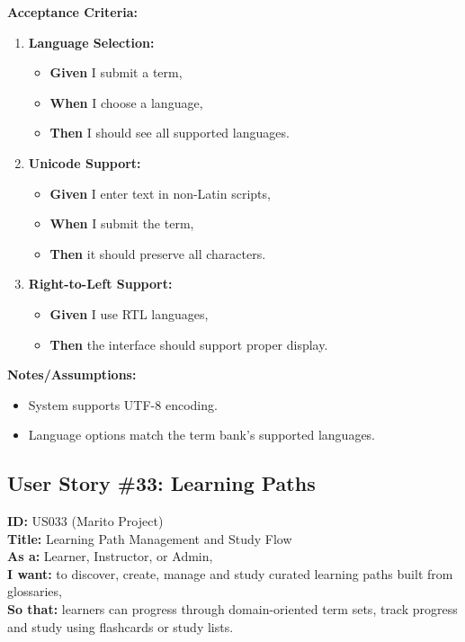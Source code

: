 \documentclass[12pt]{article}
\begin{document}
\vspace{1em}
\textbf{Acceptance Criteria:}
\begin{enumerate}
\item \textbf{Language Selection:}
\begin{itemize}
\item \textbf{Given} I submit a term,
\item \textbf{When} I choose a language,
\item \textbf{Then} I should see all supported languages.
\end{itemize}

\item \textbf{Unicode Support:}
\begin{itemize}
    \item \textbf{Given} I enter text in non-Latin scripts,
    \item \textbf{When} I submit the term,
    \item \textbf{Then} it should preserve all characters.
\end{itemize}

\item \textbf{Right-to-Left Support:}
\begin{itemize}
    \item \textbf{Given} I use RTL languages,
    \item \textbf{Then} the interface should support proper display.
\end{itemize}
\end{enumerate}

\vspace{1em}
\textbf{Notes/Assumptions:}
\begin{itemize}
\item System supports UTF-8 encoding.
\item Language options match the term bank's supported languages.
\end{itemize}

\subsection{User Story \#33: Learning Paths}

\textbf{ID:} US033 (Marito Project) \\
\textbf{Title:} Learning Path Management and Study Flow \\
\textbf{As a:} Learner, Instructor, or Admin, \\
\textbf{I want:} to discover, create, manage and study curated learning paths built from glossaries, \\
\textbf{So that:} learners can progress through domain-oriented term sets, track progress and study using flashcards or study lists.
\end{document}
